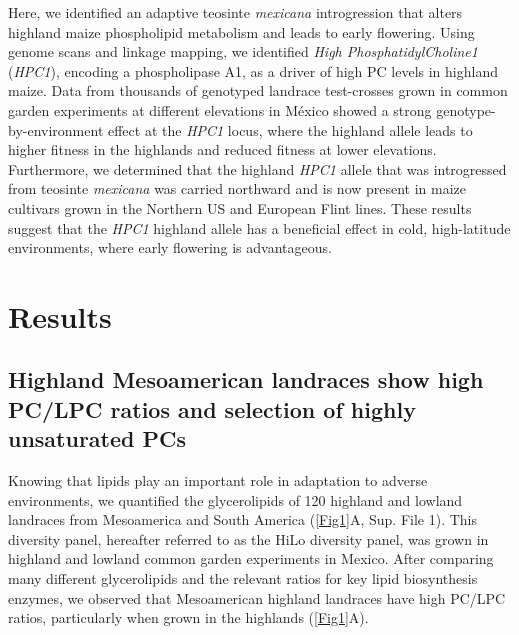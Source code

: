 \documentclass[9pt,twocolumn,twoside,lineno]{biorxiv}
\newcommand{\mex}{\textit{mexicana}\xspace}
\newcommand{\hpc}{\textit{HPC1}\xspace}
\begin{document}
Here, we identified an adaptive teosinte \mex introgression that alters highland maize phospholipid metabolism and leads to early flowering.
Using genome scans and linkage mapping, we identified \textit{High PhosphatidylCholine1} (\hpc), encoding a phospholipase A1, as a driver of high PC levels in highland maize. 
Data from thousands of genotyped landrace test-crosses grown in common garden experiments at different elevations in M\'exico showed a strong genotype-by-environment effect at the \hpc locus, where the highland allele leads to higher fitness in the highlands and reduced fitness at lower elevations.
Furthermore, we determined that the highland \hpc allele that was introgressed from teosinte \mex was carried northward and is now present in maize cultivars grown in the Northern US and European Flint lines.
These results suggest that the \hpc highland allele has a beneficial effect in cold, high-latitude environments, where early flowering is advantageous.

\section{Results}
\label{sec:results}
\subsection{Highland Mesoamerican landraces show high PC/LPC ratios and selection of highly unsaturated PCs}
Knowing that lipids play an important role in adaptation to adverse environments, we quantified the glycerolipids of 120 highland and lowland landraces from Mesoamerica and South America (\cref{Fig1}A, Sup. File 1). 
This  diversity panel, hereafter referred to as the HiLo diversity panel, was grown in highland and lowland common garden experiments in Mexico.
After comparing many different glycerolipids and the relevant ratios for key lipid biosynthesis enzymes, we observed that Mesoamerican highland landraces have high PC/LPC ratios, particularly when grown in the highlands (\cref{Fig1}A).
\end{document}
